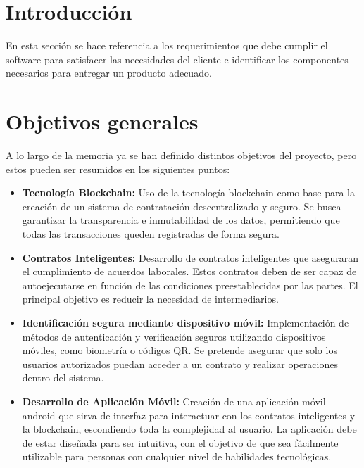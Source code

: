 
\section{Introducción}

En esta sección se hace referencia a los requerimientos que debe cumplir el software para satisfacer las necesidades del cliente e identificar los componentes necesarios para entregar un producto adecuado. 


\section{Objetivos generales}

A lo largo de la memoria ya se han definido distintos objetivos del proyecto, pero estos pueden ser resumidos en los siguientes puntos:

\begin{itemize}

\item \textbf{Tecnología Blockchain:} Uso de la tecnología blockchain como base para la creación de un sistema de contratación descentralizado y seguro.
Se busca garantizar la transparencia e inmutabilidad de los datos, permitiendo que todas las transacciones queden registradas de forma segura.

\item \textbf{Contratos Inteligentes:} Desarrollo de contratos inteligentes que aseguraran el cumplimiento de acuerdos laborales.
Estos contratos deben de ser capaz de autoejecutarse en función de las condiciones preestablecidas por las partes. El principal objetivo es reducir la necesidad de intermediarios.

\item \textbf{Identificación segura mediante dispositivo móvil:} Implementación de métodos de autenticación y verificación seguros utilizando dispositivos móviles, como biometría o códigos QR.
Se pretende asegurar que solo los usuarios autorizados puedan acceder a un contrato y realizar operaciones dentro del sistema.

\item \textbf{Desarrollo de Aplicación Móvil:} Creación de una aplicación móvil android que sirva de interfaz para interactuar con los contratos inteligentes y la blockchain, escondiendo toda la complejidad al usuario.
La aplicación debe de estar diseñada para ser intuitiva, con el objetivo de que sea fácilmente utilizable para personas con cualquier nivel de habilidades tecnológicas.

\end{itemize}

